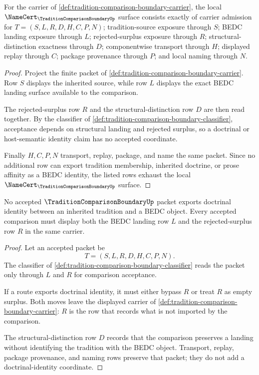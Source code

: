 \begin{theorem}
\label{thm:tradition-comparison-boundary-namecert-obligations}
For the carrier of \autoref{def:tradition-comparison-boundary-carrier}, the local $\NameCert_{\TraditionComparisonBoundaryUp}$ surface consists exactly of carrier admission for $T=(S,L,R,D,H,C,P,N)$; tradition-source exposure through $S$; BEDC landing exposure through $L$; rejected-surplus exposure through $R$; structural-distinction exactness through $D$; componentwise transport through $H$; displayed replay through $C$; package provenance through $P$; and local naming through $N$.
\end{theorem}
\begin{proof}
Project the finite packet of \autoref{def:tradition-comparison-boundary-carrier}. Row $S$ displays the inherited source, while row $L$ displays the exact BEDC landing surface available to the comparison.

The rejected-surplus row $R$ and the structural-distinction row $D$ are then read together. By the classifier of \autoref{def:tradition-comparison-boundary-classifier}, acceptance depends on structural landing and rejected surplus, so a doctrinal or host-semantic identity claim has no accepted coordinate.

Finally $H,C,P,N$ transport, replay, package, and name the same packet. Since no additional row can export tradition membership, inherited doctrine, or prose affinity as a BEDC identity, the listed rows exhaust the local $\NameCert_{\TraditionComparisonBoundaryUp}$ surface.
\end{proof}

\begin{theorem}
\label{thm:tradition-comparison-boundary-no-doctrinal-identity}
No accepted $\TraditionComparisonBoundaryUp$ packet exports doctrinal identity between an inherited tradition and a BEDC object. Every accepted comparison must display both the BEDC landing row $L$ and the rejected-surplus row $R$ in the same carrier.
\end{theorem}
\begin{proof}
Let an accepted packet be
$$
T=(S,L,R,D,H,C,P,N).
$$
The classifier of \autoref{def:tradition-comparison-boundary-classifier} reads the packet only through $L$ and $R$ for comparison acceptance.

If a route exports doctrinal identity, it must either bypass $R$ or treat $R$ as empty surplus. Both moves leave the displayed carrier of \autoref{def:tradition-comparison-boundary-carrier}: $R$ is the row that records what is not imported by the comparison.

The structural-distinction row $D$ records that the comparison preserves a landing without identifying the tradition with the BEDC object. Transport, replay, package provenance, and naming rows preserve that packet; they do not add a doctrinal-identity coordinate.
\end{proof}

